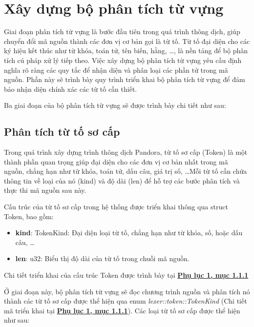 \section{Xây dựng bộ phân tích từ vựng}
Giai đoạn phân tích từ vựng là bước đầu tiên trong quá trình thông dịch, giúp chuyển đổi mã nguồn thành các đơn vị cơ bản gọi là từ tố. Từ tố đại diện cho các ký hiệu kết thúc như từ khóa, toán tử, tên biến, hằng, \dots, là nền tảng để bộ phân tích cú pháp xử lý tiếp theo. Việc xây dựng bộ phân tích từ vựng yêu cầu định nghĩa rõ ràng các quy tắc để nhận diện và phân loại các phần tử trong mã nguồn. Phần này sẽ trình bày quy trình triển khai bộ phân tích từ vựng để đảm bảo nhận diện chính xác các từ tố cần thiết.

Ba giai đoạn của bộ phân tích từ vựng sẽ được trình bày chi tiết như sau:

\subsection{Phân tích từ tố sơ cấp}
Trong quá trình xây dựng trình thông dịch Pandora, từ tố sơ cấp (Token) là một thành phần quan trọng giúp đại diện cho các đơn vị cơ bản nhất trong mã nguồn, chẳng hạn như từ khóa, toán tử, dấu câu, giá trị số, \dots Mỗi từ tố cần chứa thông tin về loại của nó (kind) và độ dài (len) để hỗ trợ các bước phân tích và thực thi mã nguồn sau này.

Cấu trúc của từ tố sơ cấp trong hệ thống được triển khai thông qua struct Token, bao gồm:
\begin{itemize}
  \item \textbf{kind}: TokenKind: Đại diện loại từ tố, chẳng hạn như từ khóa, số, hoặc dấu câu, \dots
  \item \textbf{len}: u32: Biểu thị độ dài của từ tố trong chuỗi mã nguồn.
\end{itemize}
Chi tiết triển khai của cấu trúc Token được trình bày tại \hyperref[ap1:simple_token]{\bf Phụ lục 1, mục 1.1.1}

Ở giai đoạn này, bộ phân tích từ vựng sẽ đọc chương trình nguồn và phân tích nó thành các từ tố sơ cấp được thể hiện qua enum \textit{lexer::token::TokenKind} (Chi tiết mã triển khai tại \hyperref[ap1:simple_token_kind]{\bf Phụ lục 1, mục 1.1.1}). Các loại từ tố sơ cấp được thể hiện như sau:

